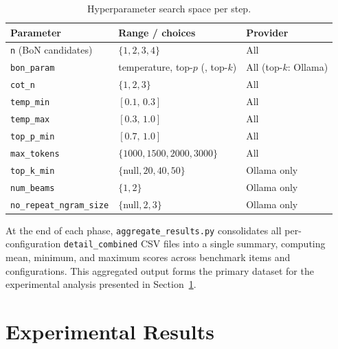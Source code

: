 \documentclass[11pt,a4paper]{article}
\begin{document}
\begin{table}[h]
\centering
\begin{tabular}{|l|l|l|}
\hline
\rowcolor{bluePoli!30}
\textbf{Parameter} & \textbf{Range / choices} & \textbf{Provider} \T\B \\
\hline
\texttt{n} (BoN candidates)         & $\{1, 2, 3, 4\}$                   & All \T\B \\
\texttt{bon\_param}                  & temperature, top-$p$ (, top-$k$)   & All (top-$k$: Ollama) \T\B \\
\texttt{cot\_n}                      & $\{1, 2, 3\}$                      & All \T\B \\
\texttt{temp\_min}                   & $[0.1,\, 0.3]$                     & All \T\B \\
\texttt{temp\_max}                   & $[0.3,\, 1.0]$                     & All \T\B \\
\texttt{top\_p\_min}                 & $[0.7,\, 1.0]$                     & All \T\B \\
\texttt{max\_tokens}                 & $\{1000, 1500, 2000, 3000\}$       & All \T\B \\
\texttt{top\_k\_min}                 & $\{$null$, 20, 40, 50\}$           & Ollama only \T\B \\
\texttt{num\_beams}                  & $\{1, 2\}$                         & Ollama only \T\B \\
\texttt{no\_repeat\_ngram\_size}     & $\{$null$, 2, 3\}$                 & Ollama only \T\B \\
\hline
\end{tabular}
\caption{Hyperparameter search space per step.}
\label{tab:searchspace}
\end{table}

At the end of each phase, \texttt{aggregate\_results.py} consolidates all
per-configuration \texttt{detail\_combined} CSV files into a single summary,
computing mean, minimum, and maximum scores across benchmark items and
configurations. This aggregated output forms the primary dataset for the
experimental analysis presented in Section~\ref{sec:experiments}.

\section{Experimental Results}
\label{sec:experiments}
\end{document}
